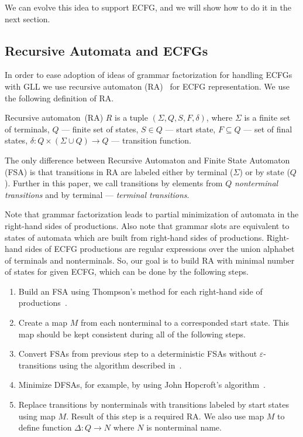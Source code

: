 \documentclass[runningheads,a4paper]{llncs}
\begin{document}
We can evolve this idea to support ECFG, and we will show how to do it in the next section.

\subsection{Recursive Automata and ECFGs}

In order to ease adoption of ideas of grammar factorization for handling ECFGs with GLL we use recursive automaton (RA)~\cite{tellier2006learning} for ECFG representation.
We use the following definition of RA.

\begin{mydef}
    Recursive automaton~(RA) $R$ is a tuple $(\Sigma, Q, S, F, \delta)$, where $\Sigma$ is a finite set of terminals, $Q$ --- finite set of states, $S \in Q$ --- start state, $F \subseteq Q$ --- set of final states, $\delta : Q \times (\Sigma \cup Q) \to Q$ --- transition function.
\end{mydef}

The only difference between Recursive Automaton and Finite State Automaton (FSA) is that transitions in RA are labeled either by terminal ($\Sigma$) or by state ($Q$).
Further in this paper, we call transitions by elements from $Q$ \textit{nonterminal transitions} and by terminal --- \textit{terminal transitions}.

Note that grammar factorization leads to partial minimization of automata in the right-hand sides of productions.
Also note that grammar slots are equivalent to states of automata which are built from right-hand sides of productions.
Right-hand sides of ECFG productions are regular expressions over the union alphabet of terminals and nonterminals.
So, our goal is to build RA with minimal number of states for given ECFG, which can be done by the following steps.
\begin{enumerate} 
\item Build an FSA using Thompson's method for each right-hand side of productions~\cite{Thompson:1968:PTR:363347.363387}.
\item Create a map $M$ from each nonterminal to a corresponded start state.
This map should be kept consistent during all of the following steps. 
\item Convert FSAs from previous step to a deterministic FSAs without $\varepsilon$-transitions using the algorithm described in~\cite{aho1974design}.
\item Minimize DFSAs, for example, by using John Hopcroft's algorithm~\cite{hopcroft1971n}.
\item Replace transitions by nonterminals with transitions labeled by start states using map $M$.
Result of this step is a required RA. We also use map $M$ to define function $\Delta : Q \to N$ where $N$ is nonterminal name.
\end{enumerate}
\end{document}
